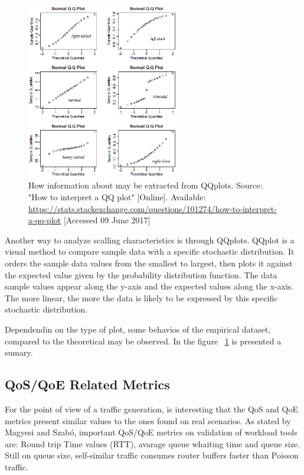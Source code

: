 \begin{figure}[ht!]
	\centering
	\includegraphics[width=0.6\textwidth]{figures/ch2/qqplot-tutorial}
	\caption{ How information about may be extracted from QQplots. Source: "How to interpret a QQ plot" [Online]. Available: \href{https://stats.stackexchange.com/questions/101274/how-to-interpret-a-qq-plot}{https://stats.stackexchange.com/questions/101274/how-to-interpret-a-qq-plot} [Accessed 09 June 2017]}
	\label{fig:qqplot-tutorial}
\end{figure}


Another way to analyze scalling characteristics is through QQplots. QQplot is a visual method to compare sample data with a specific stochastic distribution. It orders the sample data values from the smallest to largest, then plots it against the expected value given by the probability distribution function. The data sample values appear along the y-axis and the expected values along the x-axis. The more linear, the more the data is likely to be expressed by this specific stochastic distribution.

Dependendin on the type of plot, some behavios of the empirical dataset, compared to the theoretical may be observed. In the figure ~\ref{fig:qqplot-tutorial} is presented a sumary. 




\subsection{QoS/QoE Related Metrics}

For the point of view of a traffic generation, is interesting that the QoS and QoE metrics present similar values to the ones found on real scenarios. As stated by Magyesi and Szabó\cite{validate-trafficgen}, important QoS/QoE metrics on validation of workload tools are: Round trip Time values (RTT), avarage queue whaiting time and queue size. Still on queue size, self-similar traffic consumes router buffers faster than Poisson traffic\cite{multi-player-online-game-self-similarity}.


